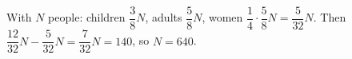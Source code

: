 With $N$ people: children $\dfrac{3}{8}N$, adults $\dfrac{5}{8}N$, women $\dfrac{1}{4}\cdot\dfrac{5}{8}N=\dfrac{5}{32}N$. Then $\dfrac{12}{32}N-\dfrac{5}{32}N=\dfrac{7}{32}N=140$, so $N=\boxed{640}$.
